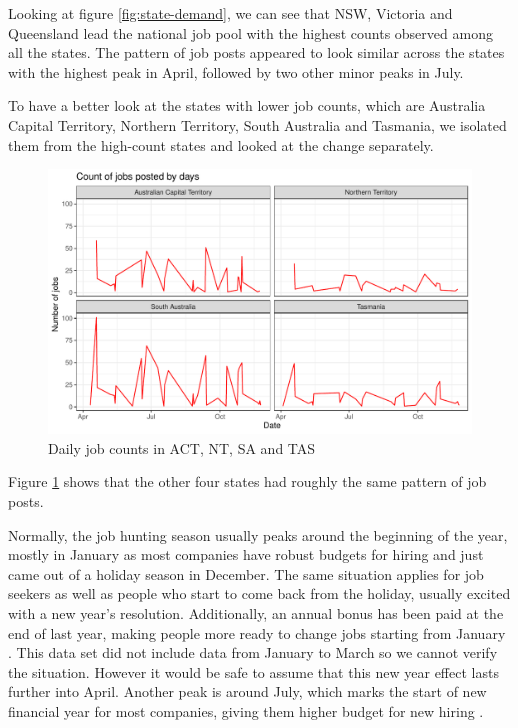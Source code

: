 \documentclass[11pt,a4paper,]{article}
\begin{document}
Looking at figure \ref{fig:state-demand}, we can see that NSW, Victoria and Queensland lead the national job pool with the highest counts observed among all the states. The pattern of job posts appeared to look similar across the states with the highest peak in April, followed by two other minor peaks in July.

To have a better look at the states with lower job counts, which are Australia Capital Territory, Northern Territory, South Australia and Tasmania, we isolated them from the high-count states and looked at the change separately.

\begin{figure}
\centering
\includegraphics{Team_JHDP_Assignment4_files/figure-latex/low-demand-state-1.pdf}
\caption{\label{fig:low-demand-state}Daily job counts in ACT, NT, SA and TAS}
\end{figure}

Figure \ref{fig:low-demand-state} shows that the other four states had roughly the same pattern of job posts.

Normally, the job hunting season usually peaks around the beginning of the year, mostly in January as most companies have robust budgets for hiring and just came out of a holiday season in December. The same situation applies for job seekers as well as people who start to come back from the holiday, usually excited with a new year's resolution. Additionally, an annual bonus has been paid at the end of last year, making people more ready to change jobs starting from January \autocite{emswiler_2016}. This data set did not include data from January to March so we cannot verify the situation. However it would be safe to assume that this new year effect lasts further into April. Another peak is around July, which marks the start of new financial year for most companies, giving them higher budget for new hiring \autocite{emswiler_2016}.
\end{document}
